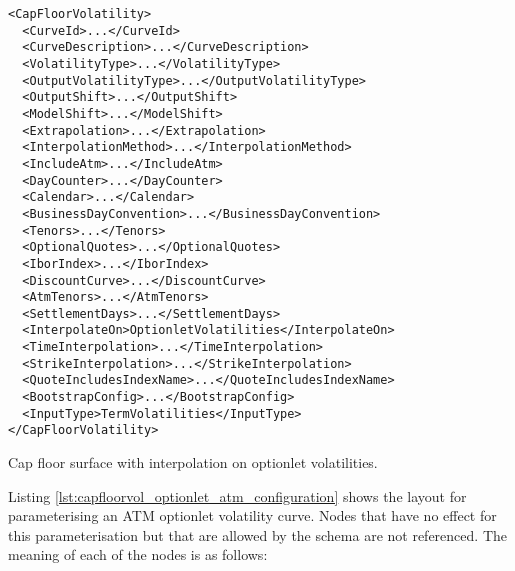 \begin{longlisting}
\begin{verbatim}
<CapFloorVolatility>
  <CurveId>...</CurveId>
  <CurveDescription>...</CurveDescription>
  <VolatilityType>...</VolatilityType>
  <OutputVolatilityType>...</OutputVolatilityType>
  <OutputShift>...</OutputShift>
  <ModelShift>...</ModelShift>
  <Extrapolation>...</Extrapolation>
  <InterpolationMethod>...</InterpolationMethod>
  <IncludeAtm>...</IncludeAtm>
  <DayCounter>...</DayCounter>
  <Calendar>...</Calendar>
  <BusinessDayConvention>...</BusinessDayConvention>
  <Tenors>...</Tenors>
  <OptionalQuotes>...</OptionalQuotes>
  <IborIndex>...</IborIndex>
  <DiscountCurve>...</DiscountCurve>
  <AtmTenors>...</AtmTenors>
  <SettlementDays>...</SettlementDays>
  <InterpolateOn>OptionletVolatilities</InterpolateOn>
  <TimeInterpolation>...</TimeInterpolation>
  <StrikeInterpolation>...</StrikeInterpolation>
  <QuoteIncludesIndexName>...</QuoteIncludesIndexName>
  <BootstrapConfig>...</BootstrapConfig>
  <InputType>TermVolatilities</InputType>
</CapFloorVolatility>
\end{verbatim}
\caption{Cap floor surface with interpolation on optionlet volatilities.}
\label{lst:capfloorvol_surface_configuration_opt}
\end{longlisting}

Listing \ref{lst:capfloorvol_optionlet_atm_configuration} shows the layout for parameterising an ATM optionlet volatility curve. Nodes that have no effect for this parameterisation but that are allowed by the schema are not referenced. The meaning of each of the nodes is as follows:

